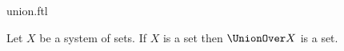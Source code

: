 \documentclass{stex}
\begin{document}
\begin{smodule}{union.ftl}



\begin{axiom*}[forthel,title=Union,name=Union Axiom]
  Let $X$ be a system of sets.
  If $X$ is a set then $\UnionOver X$ is a set.
\end{axiom*}

\end{smodule}
\end{document}
